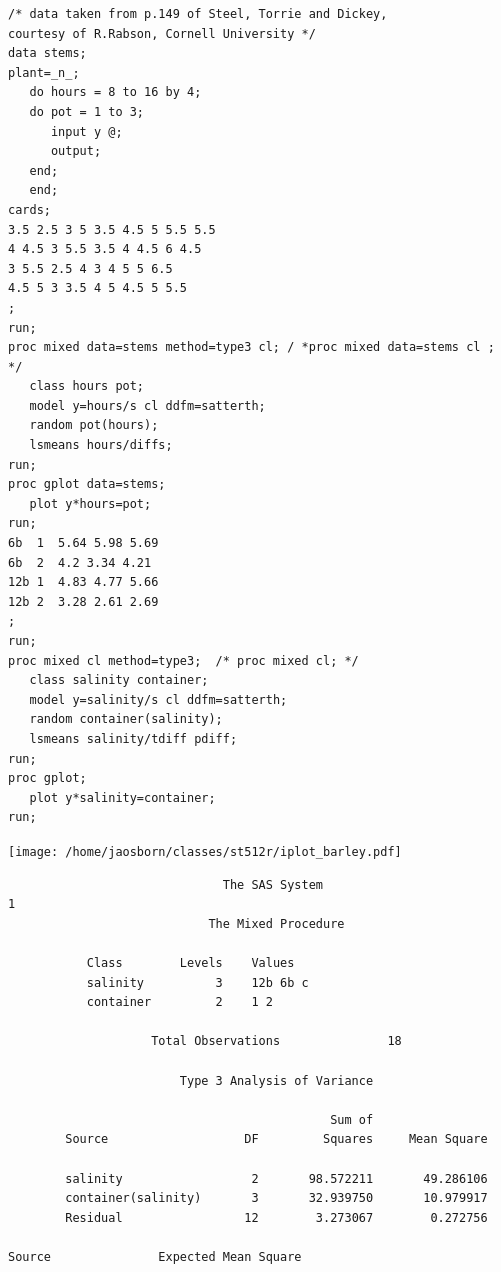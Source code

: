 \begin{large}
\begin{verbatim}
/* data taken from p.149 of Steel, Torrie and Dickey, 
courtesy of R.Rabson, Cornell University */
data stems;   
plant=_n_;
   do hours = 8 to 16 by 4;
   do pot = 1 to 3;
      input y @;
      output;
   end;
   end;
cards;
3.5 2.5 3 5 3.5 4.5 5 5.5 5.5
4 4.5 3 5.5 3.5 4 4.5 6 4.5
3 5.5 2.5 4 3 4 5 5 6.5
4.5 5 3 3.5 4 5 4.5 5 5.5
;
run;
proc mixed data=stems method=type3 cl; / *proc mixed data=stems cl ; */
   class hours pot;
   model y=hours/s cl ddfm=satterth;
   random pot(hours);
   lsmeans hours/diffs;
run;
proc gplot data=stems;
   plot y*hours=pot;
run;
6b  1  5.64 5.98 5.69
6b  2  4.2 3.34 4.21
12b 1  4.83 4.77 5.66
12b 2  3.28 2.61 2.69
;
run;
proc mixed cl method=type3;  /* proc mixed cl; */ 
   class salinity container;
   model y=salinity/s cl ddfm=satterth; 
   random container(salinity);
   lsmeans salinity/tdiff pdiff;
run;
proc gplot;
   plot y*salinity=container;
run;
\end{verbatim}
\begin{center}
\texttt{[image: /home/jaosborn/classes/st512r/iplot\_barley.pdf]}
\end{center}
\newpage
\begin{verbatim}
                              The SAS System                              1
                            The Mixed Procedure

           Class        Levels    Values
           salinity          3    12b 6b c                      
           container         2    1 2                           

                    Total Observations               18

                        Type 3 Analysis of Variance
 
                                             Sum of
        Source                   DF         Squares     Mean Square

        salinity                  2       98.572211       49.286106
        container(salinity)       3       32.939750       10.979917
        Residual                 12        3.273067        0.272756
 
Source               Expected Mean Square


\end{verbatim}
\end{large}
